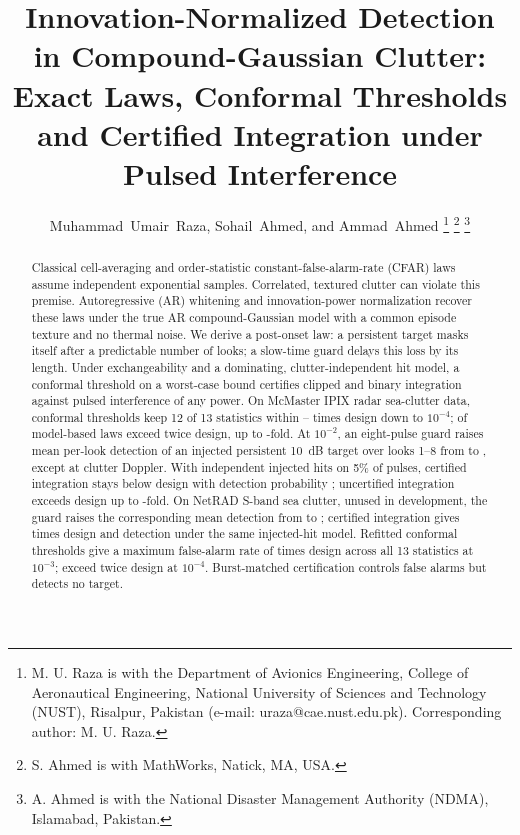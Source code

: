 \documentclass[journal]{IEEEtran}
\begin{document}
\title{Innovation-Normalized Detection in Compound-Gaussian Clutter: Exact Laws, Conformal Thresholds and Certified Integration under Pulsed Interference}

\author{Muhammad~Umair~Raza, Sohail~Ahmed, and Ammad~Ahmed%
\thanks{M. U. Raza is with the Department of Avionics Engineering, College of Aeronautical Engineering, National University of Sciences and Technology (NUST), Risalpur, Pakistan (e-mail: uraza@cae.nust.edu.pk). Corresponding author: M. U. Raza.}%
\thanks{S. Ahmed is with MathWorks, Natick, MA, USA.}%
\thanks{A. Ahmed is with the National Disaster Management Authority (NDMA), Islamabad, Pakistan.}}

\maketitle

\begin{abstract}
Classical cell-averaging and order-statistic constant-false-alarm-rate (CFAR) laws assume independent exponential samples. Correlated, textured clutter can violate this premise. Autoregressive (AR) whitening and innovation-power normalization recover these laws under the true AR compound-Gaussian model with a common episode texture and no thermal noise. We derive a post-onset law: a persistent target masks itself after a predictable number of looks; a slow-time guard delays this loss by its length. Under exchangeability and a dominating, clutter-independent hit model, a conformal threshold on a worst-case bound certifies clipped and binary integration against pulsed interference of any power. On McMaster IPIX radar sea-clutter data, conformal thresholds keep 12 of 13 statistics within \LConfMinFour--\LConfMaxFour{} times design down to $10^{-4}$; \NWhitenedLawsFail{} of \NWhitenedLaws{} model-based laws exceed twice design, up to \LAnalMaxFour-fold. At $10^{-2}$, an eight-pulse guard raises mean per-look detection of an injected persistent 10~dB target over looks 1--8 from \GuardMeanLookZero{} to \GuardMeanLookEight, except at clutter Doppler. With independent injected hits on 5\% of pulses, certified integration stays below design with detection probability \CertSixPdFive; uncertified integration exceeds design up to \IPfaMaxInt-fold. On NetRAD S-band sea clutter, unused in development, the guard raises the corresponding mean detection from \NetGuardZero{} to \NetGuardEight; certified integration gives \NetCertPfa{} times design and detection \NetCertPd{} under the same injected-hit model. Refitted conformal thresholds give a maximum false-alarm rate of \NetConfMaxThree{} times design across all 13 statistics at $10^{-3}$; \NetNOverTwoFourWord{} exceed twice design at $10^{-4}$. Burst-matched certification controls false alarms but detects no target.
\end{abstract}
\end{document}
